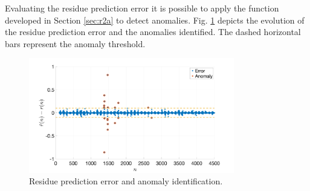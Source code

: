 \documentclass[]{scrartcl}
\begin{document}
Evaluating the residue prediction error it is possible to apply the function developed in Section \ref{sec:r2a} to detect anomalies. Fig. \ref{fig:R2b_error_an} depicts the evolution of the residue prediction error and the anomalies identified. The dashed horizontal bars represent the anomaly threshold. 
\begin{figure}[htbp]
	\centering
	\includegraphics[width= 0.8\textwidth]{figures/R2b_error_an.png}
	\caption{Residue prediction error and anomaly identification.}
	\label{fig:R2b_error_an}
\end{figure}
\end{document}
